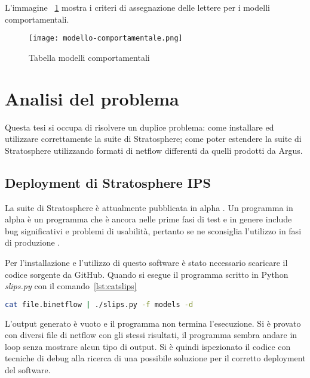 \documentclass[../main.tex]{subfiles}
\begin{document}
L'immagine ~\ref{fig:modelliComportamentali} mostra i criteri di assegnazione delle lettere per i modelli comportamentali.

\begin{figure}[H]
\centering
\texttt{[image: modello-comportamentale.png]}
				\caption{Tabella modelli comportamentali}
				\label{fig:modelliComportamentali}
\end{figure}

\section{Analisi del problema}
Questa tesi si occupa di risolvere un duplice problema: come installare ed utilizzare correttamente la suite di Stratosphere; come poter estendere la suite di Stratosphere utilizzando formati di netflow differenti da quelli prodotti da Argus.

\subsection{Deployment di Stratosphere IPS}
La suite di Stratosphere è attualmente pubblicata in alpha \cite{stratosphereSuite}. Un programma in alpha è un programma che è ancora nelle prime fasi di test e in genere include bug significativi e problemi di usabilità, pertanto se ne sconsiglia l'utilizzo in fasi di produzione \cite{alpha}.

Per l'installazione e l'utilizzo di questo software è stato necessario scaricare il codice sorgente da GitHub. Quando si esegue il programma scritto in Python \textit{slips.py} con il comando~\ref{lst:catslips}
\begin{lstlisting}[language=Bash, label={lst:catslips}, caption={comando per eseguire slips}]                                                                     
cat file.binetflow | ./slips.py -f models -d
\end{lstlisting}
L'output generato è vuoto e il programma non termina l'esecuzione. Si è provato con diversi file di netflow con gli stessi risultati, il programma sembra andare in loop senza mostrare alcun tipo di output. Si è quindi ispezionato il codice con tecniche di debug alla ricerca di una possibile soluzione per il corretto deployment del software.
\end{document}
